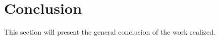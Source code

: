 \section{Conclusion}
\label{sec:Conclusion}
This section will present the general conclusion of the work realized.
